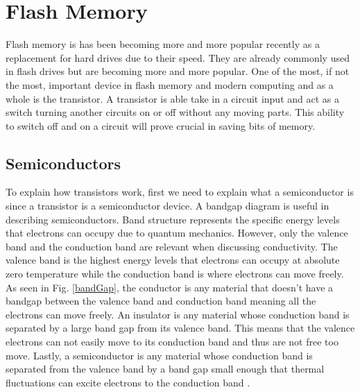 \documentclass[ notitlepage, numerical, 11pt]{revtex4-1} %
\begin{document}
\section{Flash Memory}
Flash memory is has been becoming more and more popular recently as a replacement for hard drives due to their speed. They are already commonly used in flash drives but are becoming more and more popular. One of the most, if not the most, important device in flash memory and modern computing and as a whole is the transistor. A transistor is able take in a circuit input and act as a switch turning another circuits on or off without any moving parts. This ability to switch off and on a circuit will prove crucial in saving bits of memory.

\subsection{Semiconductors}
To explain how transistors work, first we need to explain what a semiconductor is since a transistor is a semiconductor device. A bandgap diagram is useful in describing semiconductors. Band structure represents the specific energy levels that electrons can occupy due to quantum mechanics. However, only the valence band and the conduction band are relevant when discussing conductivity. The valence band is the highest energy levels that electrons can occupy at absolute zero temperature while the conduction band is where electrons can move freely. As seen in Fig. \ref{bandGap}, the conductor is any material that doesn't have a bandgap between the valence band and conduction band meaning all the electrons can move freely. An insulator is any material whose conduction band is separated by a large band gap from its valence band. This means that the valence electrons can not easily move to its conduction band and thus are not free too move. Lastly, a semiconductor is any material whose conduction band is separated from the valence band by a band gap small enough that thermal fluctuations can excite electrons to the conduction band \cite{purcell}.
\end{document}
